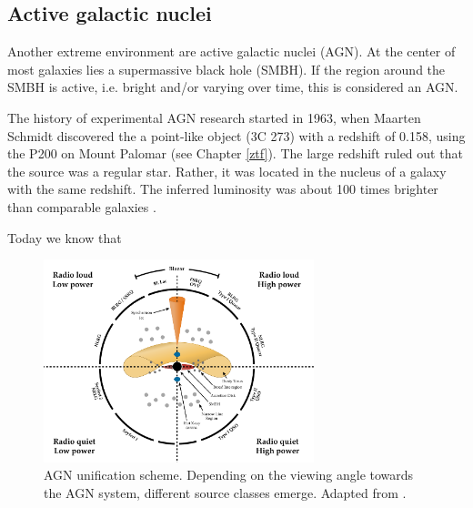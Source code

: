 \documentclass[
    a4paper, %
    fontsize=10pt, %
    twoside=false, %
    numbers=noenddot, %
    fontmethod=tex,
]{kaobook}
\begin{document}
\subsection{Active galactic nuclei}
Another extreme environment are active galactic nuclei (AGN). At the center of most galaxies lies a supermassive black hole (SMBH). If the region around the SMBH is active, i.e. bright and/or varying over time, this is considered an AGN.

The history of experimental AGN research started in 1963, when Maarten Schmidt discovered the a point-like object (3C 273) with a redshift of 0.158, using the P200 on Mount Palomar (see Chapter \ref{ztf}). The large redshift ruled out that the source was a regular star. Rather, it was located in the nucleus of a galaxy with the same redshift. The inferred luminosity was about 100 times brighter than comparable galaxies .

Today we know that 

\begin{figure}[htb]
    \includegraphics[width=0.7\textwidth]{theory/agn_unification.pdf}
    \caption[AGN]{AGN unification scheme. Depending on the viewing angle towards the AGN system, different source classes emerge. Adapted from \cite{Thorne2022}.}
\end{figure}





% 
% 
% 
% 
% 
\end{document}
